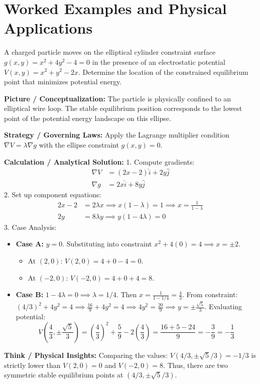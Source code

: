 \section{Worked Examples and Physical Applications}

\begin{psctexample}
A charged particle moves on the elliptical cylinder constraint surface $g(x, y) = x^2 + 4y^2 - 4 = 0$ in the presence of an electrostatic potential $V(x, y) = x^2 + y^2 - 2x$. Determine the location of the constrained equilibrium point that minimizes potential energy.

\textbf{\color{rbruNavy}Picture / Conceptualization:}
The particle is physically confined to an elliptical wire loop. The stable equilibrium position corresponds to the lowest point of the potential energy landscape on this ellipse.

\textbf{\color{rbruNavy}Strategy / Governing Laws:}
Apply the Lagrange multiplier condition $\nabla V = \lambda \nabla g$ with the ellipse constraint $g(x, y) = 0$.

\textbf{\color{rbruNavy}Calculation / Analytical Solution:}
1. Compute gradients:
\begin{align}
\nabla V &= (2x - 2)\hat{i} + 2y\hat{j} \\
\nabla g &= 2x\hat{i} + 8y\hat{j}
\end{align}
2. Set up component equations:
\begin{align}
2x - 2 &= 2\lambda x \implies x(1 - \lambda) = 1 \implies x = \frac{1}{1 - \lambda} \\
2y &= 8\lambda y \implies y(1 - 4\lambda) = 0
\end{align}
3. Case Analysis:
\begin{itemize}
    \item \textbf{Case A:} $y = 0$. Substituting into constraint $x^2 + 4(0) = 4 \implies x = \pm 2$.
    \begin{itemize}
        \item At $(2, 0)$: $V(2, 0) = 4 + 0 - 4 = 0$.
        \item At $(-2, 0)$: $V(-2, 0) = 4 + 0 + 4 = 8$.
    \end{itemize}
    \item \textbf{Case B:} $1 - 4\lambda = 0 \implies \lambda = 1/4$.
    Then $x = \frac{1}{1 - 1/4} = \frac{4}{3}$.
    From constraint: $(4/3)^2 + 4y^2 = 4 \implies \frac{16}{9} + 4y^2 = 4 \implies 4y^2 = \frac{20}{9} \implies y = \pm\frac{\sqrt{5}}{3}$.
    Evaluating potential:
    \begin{equation}
    V\left(\frac{4}{3}, \pm\frac{\sqrt{5}}{3}\right) = \left(\frac{4}{3}\right)^2 + \frac{5}{9} - 2\left(\frac{4}{3}\right) = \frac{16 + 5 - 24}{9} = -\frac{3}{9} = -\frac{1}{3}
    \end{equation}
\end{itemize}

\textbf{\color{rbruNavy}Think / Physical Insights:}
Comparing the values: $V(4/3, \pm\sqrt{5}/3) = -1/3$ is strictly lower than $V(2, 0) = 0$ and $V(-2, 0) = 8$. Thus, there are two symmetric stable equilibrium points at $(4/3, \pm\sqrt{5}/3)$.
\qedexam
\end{psctexample}

